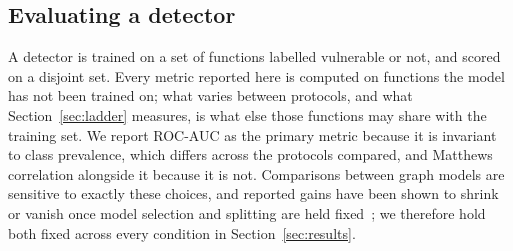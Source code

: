 \subsection{Evaluating a detector}
A detector is trained on a set of functions labelled vulnerable or not, and
scored on a disjoint set. Every metric reported here is computed on functions
the model has not been trained on; what varies between protocols, and what
Section~\ref{sec:ladder} measures, is what else those functions may share with
the training set. We report ROC-AUC as the primary metric because it is
invariant to class prevalence, which differs across the protocols compared, and
Matthews correlation alongside it because it is not. Comparisons between graph
models are sensitive to exactly these choices, and reported gains have been
shown to shrink or vanish once model selection and splitting are held
fixed~\citep{errica2020fair}; we therefore hold both fixed across every
condition in Section~\ref{sec:results}.

